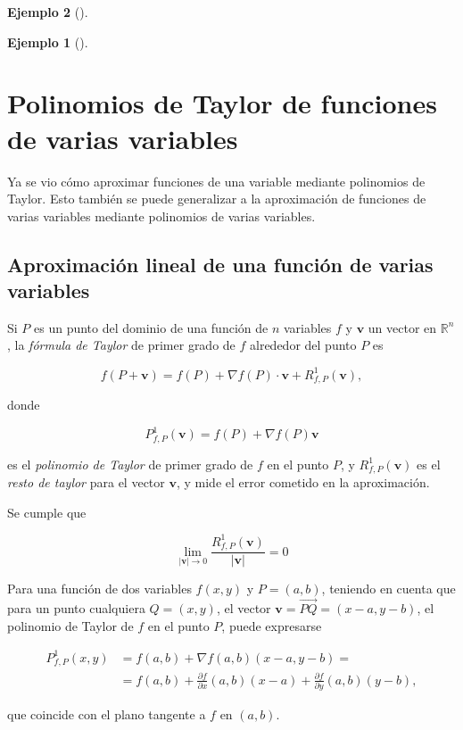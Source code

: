 \documentclass[
  a4paper,
]{scrreport}
\theoremstyle{definition}
\newtheorem{example}{Ejemplo}[chapter]
\theoremstyle{plain}
\theoremstyle{definition}
\theoremstyle{definition}
\theoremstyle{plain}
\theoremstyle{plain}
\theoremstyle{remark}
\begin{document}
\begin{example}[]
\begin{example}[]
\end{example}

\section{Polinomios de Taylor de funciones de varias
variables}\label{polinomios-de-taylor-de-funciones-de-varias-variables}

Ya se vio cómo aproximar funciones de una variable mediante polinomios
de Taylor. Esto también se puede generalizar a la aproximación de
funciones de varias variables mediante polinomios de varias variables.

\subsection{Aproximación lineal de una función de varias
variables}\label{aproximaciuxf3n-lineal-de-una-funciuxf3n-de-varias-variables}

Si \(P\) es un punto del dominio de una función de \(n\) variables \(f\)
y \(\mathbf{v}\) un vector en \(\mathbb{R}^n\), la \emph{fórmula de
Taylor} de primer grado de \(f\) alrededor del punto \(P\) es

\[
f(P+\mathbf{v}) = f(P) + \nabla f(P)\cdot \mathbf{v} +R^1_{f,P}(\mathbf{v}),
\]

donde

\[
P^1_{f,P}(\mathbf{v}) = f(P)+\nabla f(P)\mathbf{v}
\]

es el \emph{polinomio de Taylor} de primer grado de \(f\) en el punto
\(P\), y \(R^1_{f,P}(\mathbf{v})\) es el \emph{resto de taylor} para el
vector \(\mathbf{v}\), y mide el error cometido en la aproximación.

Se cumple que

\[
\lim_{|\mathbf{v}|\rightarrow 0} \frac{R^1_{f,P}(\mathbf{v})}{|\mathbf{v}|} = 0
\]

Para una función de dos variables \(f(x,y)\) y \(P=(a, b)\), teniendo en
cuenta que para un punto cualquiera \(Q=(x,y)\), el vector
\(\mathbf{v}=\vec{PQ}=(x-a, y-b)\), el polinomio de Taylor de \(f\) en
el punto \(P\), puede expresarse

\begin{align*}
P^1_{f,P}(x,y) &= f(a,b)+\nabla f(a,b)(x-a,y-b) =\\
&= f(a,b)+\frac{\partial f}{\partial x}(a,b)(x-a)+\frac{\partial f}{\partial y}(a,b)(y-b),
\end{align*}

que coincide con el plano tangente a \(f\) en \((a,b)\).


\end{example}
\end{document}
